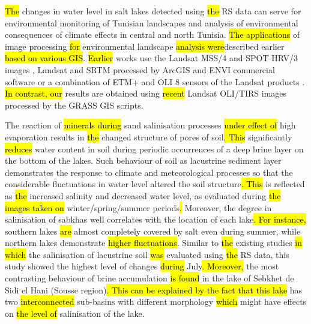 \documentclass[land,article,submit,pdftex,moreauthors]{Definitions/mdpi}
\begin{document}
\hl{The }changes in water level in salt lakes\hl{ }detected using \hl{the }RS data\hl{ }can serve for environmental monitoring of Tunisian landscapes and analysis of environmental consequences of climate effects in central and north Tunisia. \hl{The applications} of image processing \hl{for} environmental landscape \hl{analysis were}described earlier \hl{ based on various GIS}\cite{Touhami,Khelifa,Hammami,Bounouh}. \hl{Earlier} works use the Landsat MSS/4 and SPOT HRV/3 images \cite{Park}, Landsat and SRTM processed by ArcGIS and ENVI commercial software \cite{Souissi,Afrasinei} or a combination of ETM+ and OLI 8 sensors of the Landsat products \cite{Mezned}. \hl{In contrast, our} results\hl{ }are obtained using\hl{ recent }Landsat OLI/TIRS images processed by the GRASS GIS scripts. 

The reaction of \hl{minerals during }sand salinisation processes \hl{under effect of} high evaporation\hl{ }results in \hl{the }changed structure of pores of soil\hl{. This} significantly \hl{reduces} water content in soil\hl{ }during periodic occurrences of a deep brine layer on the bottom of the lakes. Such behaviour of soil as lacustrine sediment layer demonstrates the response to climate and meteorological processes so that the considerable fluctuations in water level altered the soil structure\hl{. This }is reflected as \hl{the }increased salinity and decreased water level, as evaluated during \hl{the images taken on }winter/spring/summer periods\hl{. }Moreover, the degree in salinisation of sabkhas well correlates with the location of each lake\hl{. For instance, } southern lakes \hl{are} almost completely covered by salt even during summer, while northern lakes demonstrate \hl{higher fluctuations}. Similar to \hl{the }existing studies \cite{BAYATI2021126032,SHENG2016129,SCHRODER20221710} \hl{in which} the salinisation of lacustrine soil \hl{was }evaluated using \hl{the }RS data, this study showed the highest level of changes \hl{during }July\hl{. Moreover, }the most contrasting behaviour of brine accumulation \hl{is found }in the lake of Sebkhet de Sidi el Hani (Sousse region)\hl{. This can be explained by the fact that this lake} has two \hl{interconnected} sub-basins with different morphology \hl{which} might have effects on \hl{the level of }salinisation of the lake. 
\end{document}
